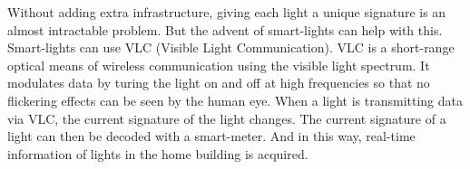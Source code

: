 Without adding extra infrastructure, giving each light a unique signature is an almost intractable problem.
But the advent of smart-lights can help with this.
Smart-lights can use VLC (Visible Light Communication).
VLC is a short-range optical means of wireless communication using the visible light spectrum.
It modulates data by turing the light on and off at high frequencies so that no flickering effects can be seen by the human eye.
When a light is transmitting data via VLC, the current signature of the light changes.
The current signature of a light can then be decoded with a smart-meter.
And in this way, real-time information of lights in the home building is acquired.













